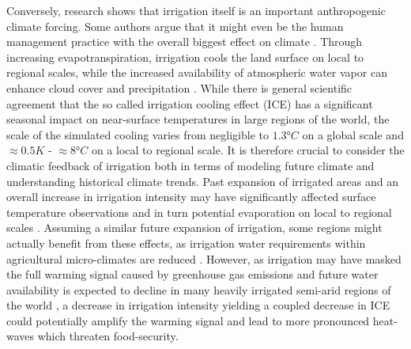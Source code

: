 \documentclass[hess, manuscript]{copernicus}
\begin{document}
Conversely, research shows that irrigation itself is an important anthropogenic climate forcing. Some authors argue that it might even be the human management practice with the overall biggest effect on climate \citep{sacks-2009}. Through increasing evapotranspiration, irrigation cools the land surface on local to regional scales, while the increased availability of atmospheric water vapor can enhance cloud cover and precipitation \citep{Boucher2004,lobell_2006, sacks-2009}. While there is general scientific agreement that the so called irrigation cooling effect (ICE) has a significant seasonal impact on near-surface temperatures in large regions of the world, the scale of the simulated cooling varies from negligible to $1.3 \si{\degree} C$ on a global scale and $\approx 0.5 K$ - $\approx 8 \si{\degree} C$ on a local to regional scale.
It is therefore crucial to consider the climatic feedback of irrigation both in terms of modeling future climate and understanding historical climate trends. Past expansion of irrigated areas and an overall increase in irrigation intensity may have significantly affected surface temperature observations and in turn potential evaporation on local to regional scales \citep{lobell_2006}. Assuming a similar future expansion of irrigation, some regions might actually benefit from these effects, as irrigation water requirements within agricultural micro-climates are reduced \citep{Ozdogan2006}. However, as irrigation may have masked the full warming signal caused by greenhouse gas emissions \citep{Bonfils2007, Kueppers2007} and future water availability is expected to decline in many heavily irrigated semi-arid regions of the world \citep{Rijsberman_2006}, a decrease in irrigation intensity yielding a coupled decrease in ICE could potentially amplify the warming signal and lead to more pronounced heat-waves which threaten food-security.\\
\end{document}
